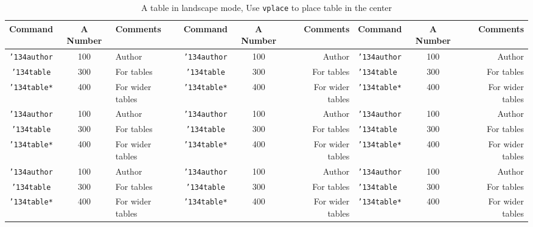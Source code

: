 \begin{pdflandscape}
	\begin{vplace}
		\begin{table}[h]
			\caption{A table in landscape mode, Use \texttt{vplace} to place table in the center}
			\label{tab:landscape}
			\centering
			\begin{tabular}{cclccrlcr}
				\toprule
				Command                    & A Number & Comments         & Command                    & A Number & Comments         & Command                    & A Number & Comments         \\
				\midrule
				\texttt{{\char'134}author} & 100      & Author           & \texttt{{\char'134}author} & 100      & Author           & \texttt{{\char'134}author} & 100      & Author           \\
				\texttt{{\char'134}table}  & 300      & For tables       & \texttt{{\char'134}table}  & 300      & For tables       & \texttt{{\char'134}table}  & 300      & For tables       \\
				\texttt{{\char'134}table*} & 400      & For wider tables & \texttt{{\char'134}table*} & 400      & For wider tables & \texttt{{\char'134}table*} & 400      & For wider tables \\
				\texttt{{\char'134}author} & 100      & Author           & \texttt{{\char'134}author} & 100      & Author           & \texttt{{\char'134}author} & 100      & Author           \\
				\texttt{{\char'134}table}  & 300      & For tables       & \texttt{{\char'134}table}  & 300      & For tables       & \texttt{{\char'134}table}  & 300      & For tables       \\
				\texttt{{\char'134}table*} & 400      & For wider tables & \texttt{{\char'134}table*} & 400      & For wider tables & \texttt{{\char'134}table*} & 400      & For wider tables \\
				\texttt{{\char'134}author} & 100      & Author           & \texttt{{\char'134}author} & 100      & Author           & \texttt{{\char'134}author} & 100      & Author           \\
				\texttt{{\char'134}table}  & 300      & For tables       & \texttt{{\char'134}table}  & 300      & For tables       & \texttt{{\char'134}table}  & 300      & For tables       \\
				\texttt{{\char'134}table*} & 400      & For wider tables & \texttt{{\char'134}table*} & 400      & For wider tables & \texttt{{\char'134}table*} & 400      & For wider tables \\

\end{tabular}
\end{table}
\end{vplace}
\end{pdflandscape}
